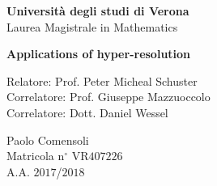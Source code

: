 {
\thispagestyle{empty}

\begin{center}
{\Large \textbf{Universit\`a degli studi di Verona\\}}
{\Large  Laurea Magistrale in Mathematics}
\end{center}

\vskip5cm


\begin{center}
{\huge \textbf{Applications of hyper-resolution}}
\end{center}


{\large
\vskip2.5cm\noindent Relatore:  Prof. Peter Micheal Schuster\\
Correlatore: Prof. Giuseppe Mazzuoccolo\\
Correlatore: Dott. Daniel Wessel\\
}

\vskip3cm
\hskip9cm\parbox[t]{7cm}
{\large 
Paolo Comensoli\\
Matricola n$^\circ$ VR$407226$\\
A.A. $2017$/$2018$\\
}

\newpage
\newpage
\thispagestyle{empty}
\clearpage
}

